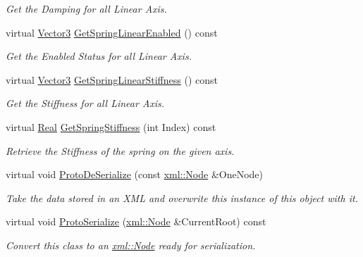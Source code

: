 \begin{DoxyCompactItemize}
\begin{DoxyCompactList}\small\item\em Get the Damping for all Linear Axis. \item\end{DoxyCompactList}\item 
virtual \hyperlink{classMezzanine_1_1Vector3}{Vector3} \hyperlink{classMezzanine_1_1Generic6DofSpringConstraint_abd30a7c9b647f2f64f55f7edefdb1775}{GetSpringLinearEnabled} () const 
\begin{DoxyCompactList}\small\item\em Get the Enabled Status for all Linear Axis. \item\end{DoxyCompactList}\item 
virtual \hyperlink{classMezzanine_1_1Vector3}{Vector3} \hyperlink{classMezzanine_1_1Generic6DofSpringConstraint_a251631fcc79aa186b3ceb498f293ce84}{GetSpringLinearStiffness} () const 
\begin{DoxyCompactList}\small\item\em Get the Stiffness for all Linear Axis. \item\end{DoxyCompactList}\item 
virtual \hyperlink{namespaceMezzanine_a726731b1a7df72bf3583e4a97282c6f6}{Real} \hyperlink{classMezzanine_1_1Generic6DofSpringConstraint_adf49b712b19dfa18bfccc643871db30e}{GetSpringStiffness} (int Index) const 
\begin{DoxyCompactList}\small\item\em Retrieve the Stiffness of the spring on the given axis. \item\end{DoxyCompactList}\item 
virtual void \hyperlink{classMezzanine_1_1Generic6DofSpringConstraint_a30cd26edd9d57aa68cf7f55f31fb99b0}{ProtoDeSerialize} (const \hyperlink{classMezzanine_1_1xml_1_1Node}{xml::Node} \&OneNode)
\begin{DoxyCompactList}\small\item\em Take the data stored in an XML and overwrite this instance of this object with it. \item\end{DoxyCompactList}\item 
virtual void \hyperlink{classMezzanine_1_1Generic6DofSpringConstraint_a02841289ca30d307e1e39b47d610ff18}{ProtoSerialize} (\hyperlink{classMezzanine_1_1xml_1_1Node}{xml::Node} \&CurrentRoot) const 
\begin{DoxyCompactList}\small\item\em Convert this class to an \hyperlink{classMezzanine_1_1xml_1_1Node}{xml::Node} ready for serialization. \item\end{DoxyCompactList}\item 

\end{DoxyCompactItemize}
